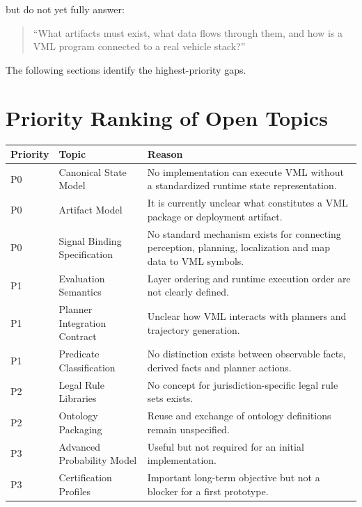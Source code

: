 \documentclass[a4paper,11pt]{article}
\begin{document}
but do not yet fully answer:

\begin{quote}
``What artifacts must exist,
what data flows through them,
and how is a VML program connected to a real vehicle stack?''
\end{quote}

The following sections identify the highest-priority gaps.

\section{Priority Ranking of Open Topics}

\begin{longtable}{|p{1cm}|p{6cm}|p{6cm}|}
\hline
Priority &
Topic &
Reason \\
\hline

P0 &
Canonical State Model &
No implementation can execute VML without a standardized runtime state representation.\\
\hline

P0 &
Artifact Model &
It is currently unclear what constitutes a VML package or deployment artifact.\\
\hline

P0 &
Signal Binding Specification &
No standard mechanism exists for connecting perception, planning, localization and map data to VML symbols.\\
\hline

P1 &
Evaluation Semantics &
Layer ordering and runtime execution order are not clearly defined.\\
\hline

P1 &
Planner Integration Contract &
Unclear how VML interacts with planners and trajectory generation.\\
\hline

P1 &
Predicate Classification &
No distinction exists between observable facts, derived facts and planner actions.\\
\hline

P2 &
Legal Rule Libraries &
No concept for jurisdiction-specific legal rule sets exists.\\
\hline

P2 &
Ontology Packaging &
Reuse and exchange of ontology definitions remain unspecified.\\
\hline

P3 &
Advanced Probability Model &
Useful but not required for an initial implementation.\\
\hline

P3 &
Certification Profiles &
Important long-term objective but not a blocker for a first prototype.\\
\hline

\end{longtable}
\end{document}
